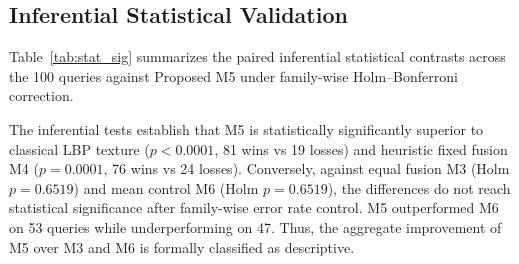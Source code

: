 \documentclass[pdflatex,sn-mathphys-num]{sn-jnl}
\renewenvironment{table}[1][]{%
  \begin{tableorg}[#1]%
  \centering
}{%
  \end{tableorg}%
}
\begin{document}
\subsection{Inferential Statistical Validation}\label{subsec5.2}
Table~\ref{tab:stat_sig} summarizes the paired inferential statistical contrasts across the 100 queries against Proposed M5 under family-wise Holm--Bonferroni correction.

\begin{table}[!htbp]
\centering
\caption{Paired inferential statistical contrasts against Proposed M5 across 100 queries under Holm--Bonferroni correction}\label{tab:stat_sig}
\vspace{2mm}
\renewcommand{\arraystretch}{1.15}
\centerline{}
\end{table}

The inferential tests establish that M5 is statistically significantly superior to classical LBP texture ($p < 0.0001$, 81 wins vs 19 losses) and heuristic fixed fusion M4 ($p = 0.0001$, 76 wins vs 24 losses). Conversely, against equal fusion M3 (Holm $p = 0.6519$) and mean control M6 (Holm $p = 0.6519$), the differences do not reach statistical significance after family-wise error rate control. M5 outperformed M6 on 53 queries while underperforming on 47. Thus, the aggregate improvement of M5 over M3 and M6 is formally classified as descriptive.
\end{document}
